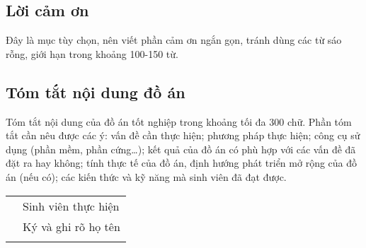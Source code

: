 \thispagestyle{empty}

\subsection*{\centering Lời cảm ơn}
Đây là mục tùy chọn, nên viết phần cảm ơn ngắn gọn, tránh dùng các từ sáo rỗng, giới hạn trong khoảng 100-150 từ. 

\subsection*{\centering Tóm tắt nội dung đồ án}
Tóm tắt nội dung của đồ án tốt nghiệp trong khoảng tối đa 300 chữ. Phần tóm tắt cần nêu được các ý: vấn đề cần thực hiện; phương pháp thực hiện; công cụ sử dụng (phần mềm, phần cứng…); kết quả của đồ án có phù hợp với các vấn đề đã đặt ra hay không; tính thực tế của đồ án, định hướng phát triển mở rộng của đồ án (nếu có); các kiến thức và kỹ năng mà sinh viên đã đạt được.


\vfill
\begin{tabularx}{\textwidth}{>{\centering\arraybackslash}X>{\centering\arraybackslash}X}
    \centering
    & Sinh viên thực hiện \\
    \centering
    &\fontsize{10pt}{0}\selectfont Ký và ghi rõ họ tên \\
    \centering
\end{tabularx}
  
\cleardoublepage